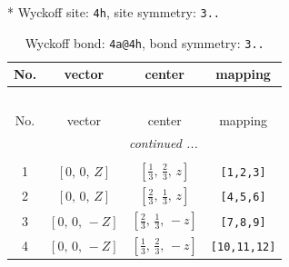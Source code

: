 \documentclass[fleqn,8pt]{jsarticle}
\begin{document}
* Wyckoff site: {\tt 4h}, site symmetry: {\tt 3..}
\renewcommand{\arraystretch}{1.2}
\begin{longtable}{cccc}
\caption{Wyckoff bond: {\tt 4a@4h}, bond symmetry: {\tt 3..}}
 \\
 \hline \hline
No. & vector & center & mapping \\ \hline \endfirsthead

\multicolumn{3}{l}{\tablename\ \thetable{}} \\
 \hline \hline
No. & vector & center & mapping \\ \hline \endhead

 \hline \hline
\multicolumn{3}{r}{\footnotesize\it continued ...} \\ \endfoot

 \hline \hline
\multicolumn{3}{r}{} \\ \endlastfoot

1 & $\left[ 0,\, 0,\, Z \right]$ & $\left[ \frac{1}{3},\, \frac{2}{3},\, z \right]$ & {\tt [1,2,3]} \\ \hline
2 & $\left[ 0,\, 0,\, Z \right]$ & $\left[ \frac{2}{3},\, \frac{1}{3},\, z \right]$ & {\tt [4,5,6]} \\ \hline
3 & $\left[ 0,\, 0,\, - Z \right]$ & $\left[ \frac{2}{3},\, \frac{1}{3},\, - z \right]$ & {\tt [7,8,9]} \\ \hline
4 & $\left[ 0,\, 0,\, - Z \right]$ & $\left[ \frac{1}{3},\, \frac{2}{3},\, - z \right]$ & {\tt [10,11,12]} \\
\end{longtable}
\renewcommand{\arraystretch}{1.2}
\end{document}

